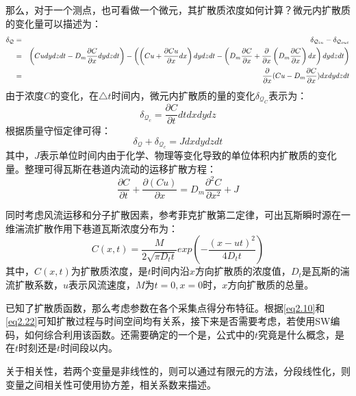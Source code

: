 那么，对于一个测点，也可看做一个微元，其扩散质浓度如何计算？微元内扩散质的变化量可以描述为：
\begin{eqnarray}
    \delta_{\mathcal{Q}} &=& \delta_{\mathcal{Q}_{in}} - \delta_{\mathcal{Q}_{out}} \notag \\
    &=& \left(Cudydzdt - D_m\dfrac{\partial C}{\partial x}dydzdt\right) - \left( \left(Cu+\dfrac{\partial Cu}{\partial x}dx\right)dydzdt-\left(D_m \dfrac{\partial C}{\partial x} + \dfrac{\partial}{\partial x}\left(D_m \dfrac{\partial C}{\partial x}\right)dx\right)dydzdt \right) \notag \\
    &=& \dfrac{\partial}{\partial x}(Cu- D_m \dfrac{\partial C}{\partial x})dxdydzdt
    \label{eq-diffuseness}
\end{eqnarray}
由于浓度$C$的变化，在$\triangle t$时间内，微元内扩散质的量的变化$\delta_{\mathcal{Q}_C}$表示为：
\begin{equation}
    \delta_{\mathcal{Q}_c} = \dfrac{\partial C}{\partial t}dtdxdydz
    \label{eq-diffusenesschange}
\end{equation}
根据质量守恒定律可得：
\begin{equation}
    \delta_{\mathcal{Q}} + \delta_{\mathcal{Q}_c} = Jdxdydzdt
    \label{eq-conservation}
\end{equation}
其中，$J$表示单位时间内由于化学、物理等变化导致的单位体积内扩散质的变化量。整理可得瓦斯在巷道内流动的运移扩散方程：
\begin{equation}
    \dfrac{\partial C}{\partial t}+\dfrac{\partial(Cu)}{\partial x} = D_m\dfrac{\partial^2C}{\partial x^2}+J
    \label{eq-gasdiffuseness}
\end{equation}


同时考虑风流运移和分子扩散因素，参考菲克扩散第二定律，可出瓦斯瞬时源在一维湍流扩散作用下巷道瓦斯浓度分布为：
\begin{equation}
    C(x,t) = \dfrac{M}{2\sqrt{\pi D_t t}}exp\left(-\dfrac{(x-ut)^2}{4D_t t}\right)
    \label{eq2.22}
\end{equation}
其中，$C(x,t)$为扩散质浓度，是$t$时间内沿$x$方向扩散质的浓度值，$D_t$是瓦斯的湍流扩散系数，$u$表示风流速度，$M$为$t=0,x=0$时，$x$方向扩散质的总量。
 

\begin{note}
    已知了扩散质函数，那么考虑参数在各个采集点得分布特征。根据\cref{eq2.10}和\cref{eq2.22}可知扩散过程与时间空间均有关系，接下来是否需要考虑，若使用SW编码，如何综合利用该函数。还需要确定的一个是，公式中的$t$究竟是什么概念，是在$t$时刻还是$t$时间段以内。

    关于相关性，若两个变量是非线性的，则可以通过有限元的方法，分段线性化，则变量之间相关性可使用协方差，相关系数来描述。
\end{note}


